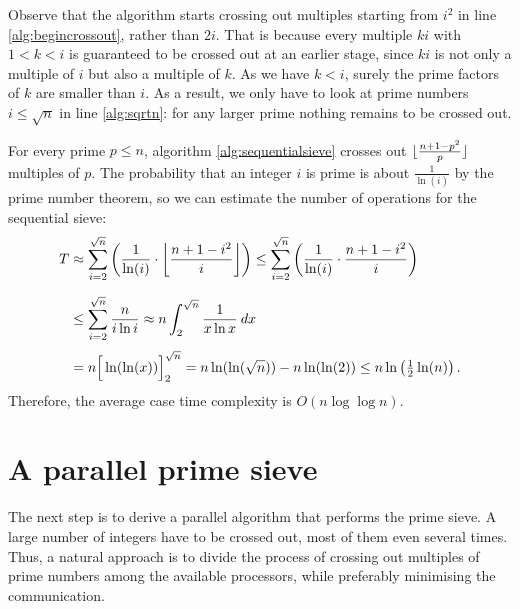 \documentclass{article}
\DeclarePairedDelimiter\floor{\lfloor}{\rfloor}
\begin{document}
Observe that the algorithm starts crossing out multiples starting from $i^2$ in line \ref{alg:begincrossout}, rather than $2i$. That is because every multiple $ki$ with $1 < k < i$ is guaranteed to be crossed out at an earlier stage, since $ki$ is not only a multiple of $i$ but also a multiple of $k$. As we have $k < i$, surely the prime factors of $k$ are smaller than $i$. As a result, we only have to look at prime numbers $i \leq \sqrt{n}$ in line \ref{alg:sqrtn}: for any larger prime nothing remains to be crossed out.

For every prime $p \leq n$, algorithm \ref{alg:sequentialsieve} crosses out $\floor{\frac{n + 1 - p^2}{p}}$ multiples of $p$. The probability that an integer $i$ is prime is about $\frac{1}{\ln(i)}$ by the prime number theorem, so we can estimate the number of operations for the sequential sieve:
\begin{align*}
	T &\approx \sum_{i=2}^{\sqrt{n}} \left(\frac{1}{\ln(i)} \cdot \left\lfloor\frac{n + 1 - i^2}{i}\right\rfloor\right) \leq \sum_{i=2}^{\sqrt{n}} \left(\frac{1}{\ln(i)}\cdot\frac{n + 1 - i^2}{i}\right)\\\noalign{\medskip}
	&\leq \sum_{i=2}^{\sqrt{n}} \frac{n}{i\ln i} \approx n\int_2^{\sqrt{n}} \frac{1}{x\ln x}\:dx\\\noalign{\smallskip}
	&= n\Big[\ln(\ln(x))\Big]_2^{\sqrt{n}} = n\ln(\ln(\sqrt{n})) - n\ln(\ln(2)) \leq n\ln\left(\tfrac{1}{2}\ln(n)\right).
\end{align*}
Therefore, the average case time complexity is $O(n\log\log n)$.

\section{A parallel prime sieve}
The next step is to derive a parallel algorithm that performs the prime sieve. A large number of integers have to be crossed out, most of them even several times. Thus, a natural approach is to divide the process of crossing out multiples of prime numbers among the available processors, while preferably minimising the communication.
\end{document}
